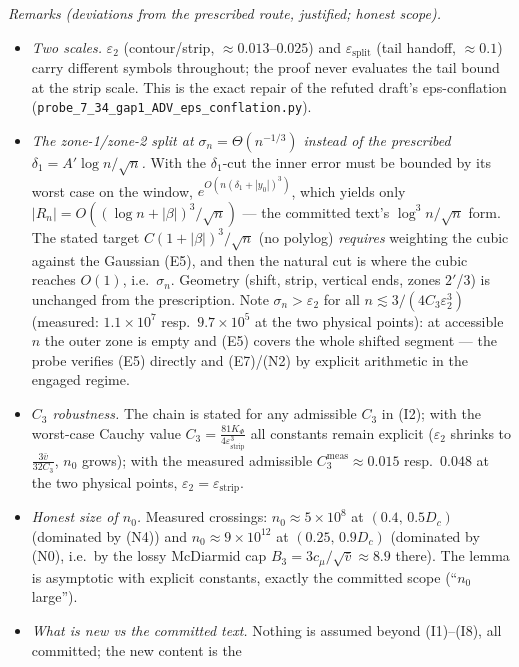 \documentclass[
]{article}
\begin{document}
\bigskip
\emph{Remarks (deviations from the prescribed route, justified;
honest scope).}
\begin{itemize}
\item[(a)] \emph{Two scales.}  $\varepsilon_2$ (contour/strip,
$\approx0.013$--$0.025$) and $\varepsilon_{\mathrm{split}}$ (tail
handoff, $\approx0.1$) carry different symbols throughout; the proof
never evaluates the tail bound at the strip scale.  This is the exact
repair of the refuted draft's eps-conflation
(\texttt{probe\_7\_34\_gap1\_ADV\_eps\_conflation.py}).
\item[(b)] \emph{The zone-1/zone-2 split at $\sigma_n=\Theta(n^{-1/3})$
instead of the prescribed $\delta_1=A'\log n/\sqrt n$.}  With the
$\delta_1$-cut the inner error must be bounded by its worst case on the
window, $e^{O(n(\delta_1+|y_0|)^3)}$, which yields only
$|R_n|=O((\log n+|\beta|)^3/\sqrt n)$ --- the committed text's
$\log^3n/\sqrt n$ form.  The stated target $C(1+|\beta|)^3/\sqrt n$
(no polylog) \emph{requires} weighting the cubic against the Gaussian
(E5), and then the natural cut is where the cubic reaches $O(1)$,
i.e.\ $\sigma_n$.  Geometry (shift, strip, vertical ends, zones
$2'$/3) is unchanged from the prescription.  Note $\sigma_n>
\varepsilon_2$ for all $n\lesssim3/(4C_3\varepsilon_2^3)$ (measured:
$1.1\times10^7$ resp.\ $9.7\times10^5$ at the two physical points): at
accessible $n$ the outer zone is empty and (E5) covers the whole
shifted segment --- the probe verifies (E5) directly and (E7)/(N2) by
explicit arithmetic in the engaged regime.
\item[(c)] \emph{$C_3$ robustness.}  The chain is stated for any
admissible $C_3$ in (I2); with the worst-case Cauchy value
$C_3=\tfrac{81K_\Phi}{4\varepsilon_{\mathrm{strip}}^3}$ all constants
remain explicit ($\varepsilon_2$ shrinks to $\tfrac{3\bar v}{32C_3}$,
$n_0$ grows); with the measured admissible $C_3^{\mathrm{meas}}
\approx0.015$ resp.\ $0.048$ at the two physical points,
$\varepsilon_2=\varepsilon_{\mathrm{strip}}$.
\item[(d)] \emph{Honest size of $n_0$.}  Measured crossings: $n_0
\approx5\times10^8$ at $(0.4,\,0.5D_c)$ (dominated by (N4)) and
$n_0\approx9\times10^{12}$ at $(0.25,\,0.9D_c)$ (dominated by (N0),
i.e.\ by the lossy McDiarmid cap $B_3=3c_\mu/\sqrt{\bar v}\approx8.9$
there).  The lemma is asymptotic with explicit constants, exactly the
committed scope (``$n_0$ large'').
\item[(e)] \emph{What is new vs the committed text.}  Nothing is
assumed beyond (I1)--(I8), all committed; the new content is the

\end{itemize}
\end{document}
